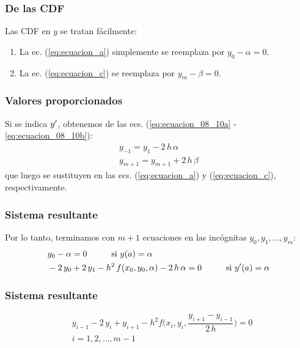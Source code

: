 \documentclass[12pt]{beamer}
\begin{document}
\begin{frame}
\frametitle{De las CDF}
Las CDF en $y$ se tratan fácilmente:
\pause
{}
\begin{enumerate}[<+->]
\item La ec. (\ref{eq:ecuacion_a}) simplemente se reemplaza por $y_{0} - \alpha = 0$.
\item La ec. (\ref{eq:ecuacion_c}) se reemplaza por $y_{m} - \beta = 0$.
\end{enumerate}
\end{frame}
\begin{frame}
\frametitle{Valores proporcionados}
Si se indica ${y}^{\prime}$, obtenemos de las ecs. (\ref{eq:ecuacion_08_10a} - \ref{eq:ecuacion_08_10b}):
\pause
\begin{align*}
y_{-1} = y_{1} - 2 \, h \, \alpha \\
y_{m+1} = y_{m+1} + 2 \, h \, \beta
\end{align*}
\pause
que luego se sustituyen en las ecs. (\ref{eq:ecuacion_a}) y (\ref{eq:ecuacion_c}), respectivamente.
\end{frame}
\begin{frame}
\frametitle{Sistema resultante}
Por lo tanto, terminamos con $m + 1$ ecuaciones en las incógnitas $y_{0}, y_{1}, \ldots, y_{m}$:
\pause
\begin{eqnarray}
\begin{aligned}
&y_{0} - \alpha = 0 \hspace{1cm} \text{si } y (a) = \alpha \\
&-2 \, y_{0} + 2 \, y_{1} - h^{2} \, f (x_{0}, y_{0}, \alpha) - 2\, h \, \alpha = 0 \hspace{1cm} \text{si } {y}^{\prime} (a) = \alpha \\
\end{aligned}
\label{eq:ecuacion_08_11_a}
\end{eqnarray}
\end{frame}
\begin{frame}
\frametitle{Sistema resultante}
\begin{align}
&{}y_{i-1} - 2 \, y_{i} + y_{i+1} - h^{2}  f \bigg( x_{i}, y_{i}, \dfrac{y_{i+1} - y_{i-1}}{2 \, h} \bigg) = 0 \label{eq:ecuacion_08_11_b}\\
&{}i = 1, 2, \ldots, m-1 \nonumber
\end{align}
\end{frame}
\end{document}
